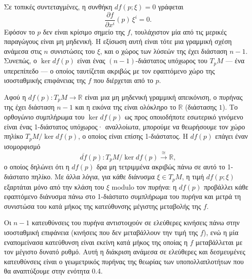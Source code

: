 \documentclass[11pt,a4paper,twoside,openright]{book}
\begin{document}
Σε τοπικές συντεταγμένες, η συνθήκη $df(p; \xi) = 0$ γράφεται
\begin{equation}
\frac{\partial f}{\partial x^i}(p) \, \xi^i = 0.
\end{equation}
Εφόσον το $p$ δεν είναι κρίσιμο σημείο της $f$, τουλάχιστον μία από τις μερικές παραγώγους είναι μη μηδενική. Η εξίσωση αυτή είναι τότε μια γραμμική σχέση ανάμεσα στις $n$ συνιστώσες του $\xi$, και ο χώρος των λύσεών της έχει διάσταση $n-1$. Συνεπώς, ο $\ker df(p)$ είναι ένας $(n-1)$-διάστατος υπόχωρος του $T_pM$ --- ένα υπερεπίπεδο --- ο οποίος ταυτίζεται ακριβώς με τον εφαπτόμενο χώρο της ισοσταθμικής επιφάνειας της $f$ που διέρχεται από το $p$.

Αφού η $df(p): T_pM \to \mathbb{R}$ είναι μια μη μηδενική γραμμική απεικόνιση, ο πυρήνας της έχει διάσταση $n-1$ και η εικόνα της είναι ολόκληρο το $\mathbb{R}$ (διάστασης $1$). Το ορθογώνιο συμπλήρωμα του $\ker df(p)$ ως προς οποιοδήποτε εσωτερικό γινόμενο είναι ένας 1-διάστατος υπόχωρος· αναλλοίωτα, μπορούμε να θεωρήσουμε τον χώρο πηλίκο $T_pM / \ker df(p)$, ο οποίος είναι επίσης 1-διάστατος. Η $df(p)$ επάγει έναν ισομορφισμό
\begin{equation}
\overline{df}(p): T_pM / \ker df(p) \xrightarrow{\cong} \mathbb{R},
\end{equation}
ο οποίος δηλώνει ότι η $df(p)$ δρα μη τετριμμένα ακριβώς πάνω σε αυτό το 1-διάστατο πηλίκο. Με άλλα λόγια, για κάθε διάνυσμα $\xi \in T_pM$, η τιμή $df(p; \xi)$ εξαρτάται μόνο από την κλάση του $\xi$ modulo τον πυρήνα: η $df(p)$ προβάλλει κάθε εφαπτόμενο διάνυσμα πάνω στο 1-διάστατο συμπλήρωμα του πυρήνα και μετρά τη συνιστώσα του κατά μήκος της κατεύθυνσης μέγιστης μεταβολής της $f$.

Οι $n-1$ κατευθύνσεις του πυρήνα αντιστοιχούν σε ελεύθερες κινήσεις πάνω στην ισοσταθμική επιφάνεια (κινήσεις που δεν μεταβάλλουν την τιμή της $f$), ενώ η μία εναπομείνασα κατεύθυνση είναι εκείνη κατά μήκος της οποίας η $f$ μεταβάλλεται με τον μέγιστο δυνατό ρυθμό. Αυτή η διάκριση ανάμεσα σε ελεύθερες και δεσμευμένες κατευθύνσεις είναι ο γεωμετρικός πυρήνας της θεωρίας των υποπολλαπλοτήτων που θα αναπτύξουμε στην ενότητα 0.4.
\end{document}
